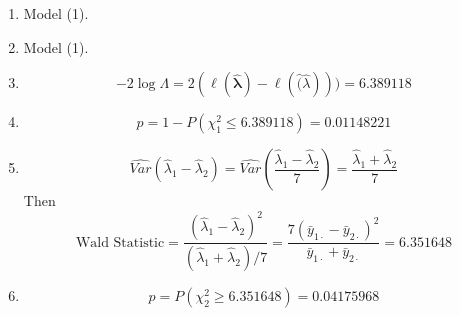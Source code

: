 \documentclass{article}
\begin{document}
\begin{enumerate}[leftmargin = 0 em, label = \arabic*., font = \bfseries]
\begin{enumerate}
		 \item 
		 Model (1).
		 \item 
		 Model (1).
		 \item 
		 \[- 2 \log \Lambda = 2 (\ell (\hat{\bm \lambda}) - \ell (\hat (\hat \lambda))) = 6.389118\]

		 \item 
		 \[ p = 1 - P(\chi_{1}^2 \leq 6.389118) = 0.01148221\]

		 \item 
		 \[\hat{Var}(\hat{\lambda}_1 - \hat{\lambda}_2) = \hat{Var}\left(\frac{\hat{\lambda}_1 - \hat{\lambda}_2}{7}\right) = \frac{\hat{\lambda}_1 + \hat{\lambda}_2}{7}\]
		 Then
		 \[\textrm{Wald Statistic} = \frac{(\hat{\lambda}_1 - \hat{\lambda}_2)^2}{(\hat{\lambda}_1 + \hat{\lambda}_2)/7} = \frac{7 (\bar{y}_{1 \cdot} - \bar{y}_{2 \cdot})^2}{\bar{y}_{1 \cdot} + \bar{y}_{2 \cdot}} = 6.351648\]
		 \item 
		 \[ p = P(\chi_{2}^2 \geq 6.351648 )= 0.04175968\]
		 
		  
	\end{enumerate}
	
	
	
	
	     
\end{enumerate}
	      
\end{document}
